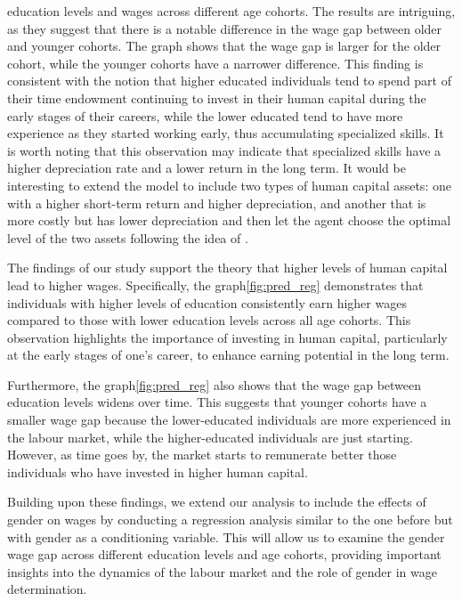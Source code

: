 \documentclass[12pt]{article}
\begin{document}
education levels and wages across different age cohorts. The results are intriguing, as they suggest that there is a
notable difference in the wage gap between older and younger cohorts. The graph shows that the wage gap is larger for
the older cohort, while the younger cohorts have a narrower difference. This finding is consistent with the notion that
higher educated individuals tend to spend part of their time endowment continuing to invest in their human capital
during the early stages of their careers, while the lower educated tend to have more experience as they started working
early, thus accumulating specialized skills. It is worth noting that this observation may indicate that specialized
skills have a higher depreciation rate and a lower return in the long term. It would be interesting to extend the model
to include two types of human capital assets: one with a higher short-term return and higher depreciation, and another
that is more costly but has lower depreciation and then let the agent choose the optimal level of the two assets
following the idea of \citet{Kruger}.
\par
The findings of our study support the theory that higher levels of human capital lead to higher wages. Specifically, the
graph\ref{fig:pred_reg} demonstrates that individuals with higher levels of education consistently earn higher wages
compared to those with lower education levels across all age cohorts. This observation highlights the importance of
investing in human capital, particularly at the early stages of one's career, to enhance earning potential in the long
term.
\par
Furthermore, the graph\ref{fig:pred_reg} also shows that the wage gap between education levels widens over time. This
suggests that younger cohorts have a smaller wage gap because the lower-educated individuals are more experienced in the
labour market, while the higher-educated individuals are just starting. However, as time goes by, the market starts
to remunerate better those individuals who have invested in higher human capital.
\par
Building upon these findings, we extend our analysis to include the effects of gender on wages by conducting a
regression analysis similar to the one before but with gender as a conditioning variable. This will allow us to examine
the gender wage gap across different education levels and age cohorts, providing important insights into the dynamics of
the labour market and the role of gender in wage determination.
\par
\end{document}
